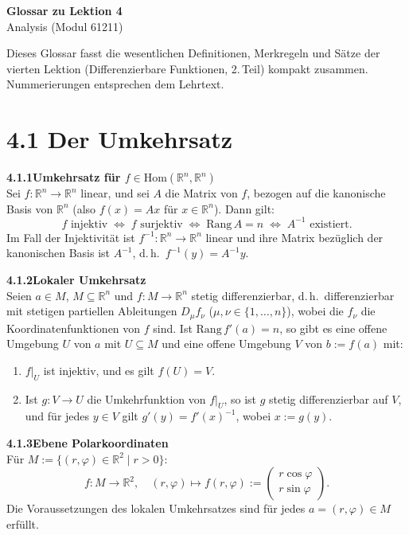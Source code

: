 \documentclass[a4paper,12pt]{article}
\newcommand{\gentry}[3]{%
  \noindent\textbf{#1\quad #2}\nopagebreak\\[0.2em]
  #3\par\smallskip
}
\begin{document}
\newpage

\begin{center}
  {\LARGE\bfseries Glossar zu Lektion 4}\\[0.5em]
  {\large Analysis (Modul 61211)}
\end{center}

\vspace{1em}

Dieses Glossar fasst die wesentlichen Definitionen, Merkregeln und Sätze der
vierten Lektion (Differenzierbare Funktionen, 2.\,Teil) kompakt zusammen.
Nummerierungen entsprechen dem Lehrtext.

\section*{4.1 \quad Der Umkehrsatz}

\gentry{4.1.1}{Umkehrsatz für $f \in \mathrm{Hom}(\mathbb{R}^n, \mathbb{R}^n)$}{%
  Sei $f: \mathbb{R}^n \to \mathbb{R}^n$ linear, und sei $A$ die Matrix von $f$, bezogen auf
  die kanonische Basis von $\mathbb{R}^n$ (also $f(x) = Ax$ für $x \in \mathbb{R}^n$). Dann gilt:
  \[
    f \text{ injektiv} \;\Leftrightarrow\; f \text{ surjektiv} \;\Leftrightarrow\;
    \mathrm{Rang}\,A = n \;\Leftrightarrow\; A^{-1} \text{ existiert.}
  \]
  Im Fall der Injektivität ist $f^{-1}: \mathbb{R}^n \to \mathbb{R}^n$ linear und ihre
  Matrix bezüglich der kanonischen Basis ist $A^{-1}$, d.\,h.\ $f^{-1}(y) = A^{-1}y$.
}

\gentry{4.1.2}{Lokaler Umkehrsatz}{%
  Seien $a \in M$, $M \subseteq \mathbb{R}^n$ und $f: M \to \mathbb{R}^n$ stetig differenzierbar,
  d.\,h.\ differenzierbar mit stetigen partiellen Ableitungen $D_\mu f_\nu$
  ($\mu, \nu \in \{1, \ldots, n\}$), wobei die $f_\nu$ die Koordinatenfunktionen von $f$ sind.
  Ist $\mathrm{Rang}\,f'(a) = n$, so gibt es eine offene Umgebung $U$ von $a$ mit $U \subseteq M$
  und eine offene Umgebung $V$ von $b := f(a)$ mit:
  \begin{enumerate}[label=(\roman*),topsep=2pt,itemsep=1pt]
    \item $f|_U$ ist injektiv, und es gilt $f(U) = V$.
    \item Ist $g: V \to U$ die Umkehrfunktion von $f|_U$, so ist $g$ stetig differenzierbar auf $V$,
          und für jedes $y \in V$ gilt $g'(y) = f'(x)^{-1}$, wobei $x := g(y)$.
  \end{enumerate}
}

\gentry{4.1.3}{Ebene Polarkoordinaten}{%
  Für $M := \{(r, \varphi) \in \mathbb{R}^2 \mid r > 0\}$:
  \[
    f: M \to \mathbb{R}^2, \quad (r, \varphi) \mapsto f(r, \varphi) := \begin{pmatrix} r\cos\varphi \\ r\sin\varphi \end{pmatrix}.
  \]
  Die Voraussetzungen des lokalen Umkehrsatzes sind für jedes $a = (r, \varphi) \in M$ erfüllt.
}
\end{document}
